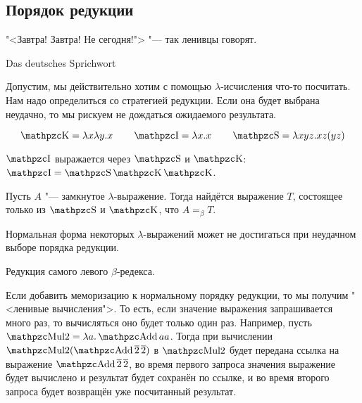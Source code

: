 \subsection{\texorpdfstring{Порядок редукции}{Order of reduction}}
\epigraph{"<Завтра! Завтра! Не сегодня!"> "--- так ленивцы говорят.}{Das deutsches Sprichwort}

Допустим, мы действительно хотим с помощью $\lambda$-исчисления что-то посчитать.
Нам надо определиться со стратегией редукции. Если она будет выбрана неудачно, то мы рискуем не дождаться ожидаемого результата.

\begin{definition}
\[
    \comb K = \lambda x \lambda y . x \qquad
    \comb I = \lambda x . x \qquad
    \comb S = \lambda x y z . x z (y z)
\]
\end{definition}
$\comb I$ выражается через $\comb S$ и $\comb K$: $\comb I = \comb S \comb K \comb K$.

\begin{statement} \label{SK-basis}
    Пусть $A$ "--- замкнутое $\lambda$-выражение.
    Тогда найдётся выражение $T$, состоящее только из $\comb S$ и $\comb K$, что $A =_{\beta}T$.
\end{statement}

\begin{wrapfigure}[2]{r}{0pt}
\centering
{}
\caption*{}
\end{wrapfigure}
Нормальная форма некоторых $\lambda$-выражений может не достигаться при неудачном выборе порядка редукции.

\begin{definition}
    Редукция самого левого $\beta$-редекса.
\end{definition}
Если добавить меморизацию к нормальному порядку редукции, то мы получим "<ленивые вычисления">.
То есть, если значение выражения запрашивается много раз, то вычисляться оно будет только один раз.
Например, пусть $\comb{Mul2} = \lambda a . \comb{Add} a a$.
Тогда при вычислении $\comb{Mul2} (\comb{Add} \mathinner{\overline 2} \overline 2)$ в $\comb{Mul2}$ будет передана ссылка
на выражение $\comb{Add} \mathinner{\overline 2} \overline 2$,
во время первого запроса значения выражение будет вычислено и результат будет сохранён по ссылке,
и во время второго запроса будет возвращён уже посчитанный результат.

